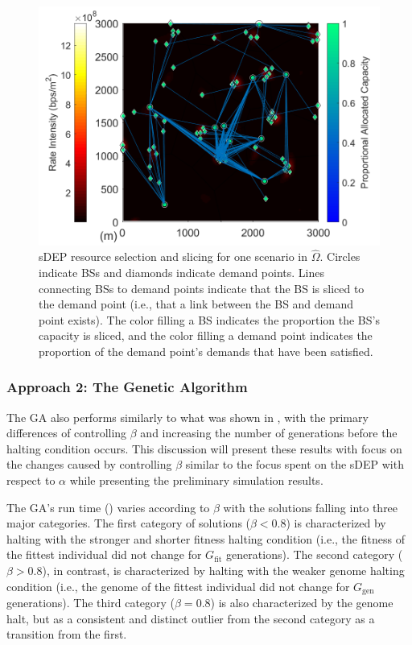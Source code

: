 \documentclass[12pt,dvipsnames]{report}
\begin{document}
\begin{figure}[htp]
	\centering
	\includegraphics[height=0.4\textheight]{Figures/CaseI_VoronoiDemandAllocation_sDEP_10BS}
	\caption[One sDEP resource selection and slicing solution for Case I]{sDEP resource selection and slicing for one scenario in $\hat{\Omega}$.  Circles indicate BSs and diamonds indicate demand points.  Lines connecting BSs to demand points indicate that the BS is sliced to the demand point (i.e., that a link between the BS and demand point exists).  The color filling a BS indicates the proportion the BS's capacity is sliced, and the color filling a demand point indicates the proportion of the demand point's demands that have been satisfied.}
	\label{fig:CaseI_VoronoiDemandAllocation_sDEP}
\end{figure}

\subsubsection{Approach 2: The Genetic Algorithm}

The GA also performs similarly to what was shown in , with the primary differences of controlling $\beta$ and increasing the number of generations before the halting condition occurs.  This discussion will present these results with focus on the changes caused by controlling $\beta$ similar to the focus spent on the sDEP with respect to $\alpha$ while presenting the preliminary simulation results.

The GA's run time () varies according to $\beta$ with the solutions falling into three major categories.  The first category of solutions ($\beta < 0.8$) is characterized by halting with the stronger and shorter fitness halting condition (i.e., the fitness of the fittest individual did not change for $G_{\text{fit}}$ generations).  The second category ($\beta > 0.8$), in contrast, is characterized by halting with the weaker genome halting condition (i.e., the genome of the fittest individual did not change for $G_{\text{gen}}$ generations).  The third category ($\beta = 0.8$) is also characterized by the genome halt, but as a consistent and distinct outlier from the second category as a transition from the first.
\end{document}
